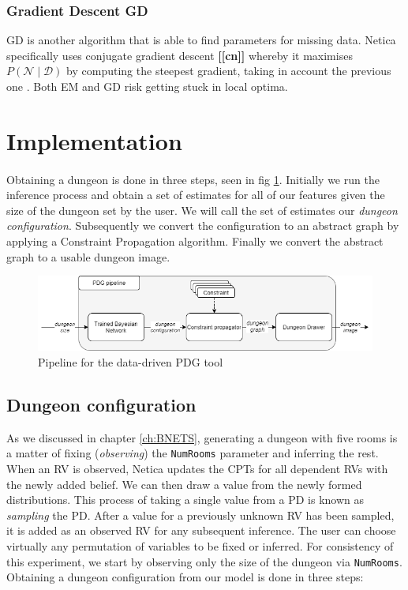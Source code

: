 \documentclass{UoYCSproject}
\begin{document}
\subsubsection{Gradient Descent GD}
GD is another algorithm that is able to find parameters for missing data. Netica specifically uses conjugate gradient descent \textbf{[[cn]]} whereby it maximises \(P(\mathcal{N} \mid \mathcal{D})\) by computing the steepest gradient, taking in account the previous one \parencite[p47]{neticaCman}. Both EM and GD risk getting stuck in local optima.

\section{Implementation}
\label{sec:implementation}
\paragraph{}
Obtaining a dungeon is done in three steps, seen in fig \ref{fig:PDGPipeline}. Initially we run the inference process and obtain a set of estimates for all of our features given the size of the dungeon set by the user. We will call the set of estimates our \textit{dungeon configuration}. Subsequently we convert the configuration to an abstract graph by applying a Constraint Propagation algorithm. Finally we convert the abstract graph to a usable dungeon image.

\begin{figure}[htb]
  \centering
    \includegraphics[width=\textwidth]{figures/BPDG_flow.png}
    \caption{Pipeline for the data-driven PDG tool}
  \label{fig:PDGPipeline}
\end{figure}

\subsection{Dungeon configuration}
As we discussed in chapter \ref{ch:BNETS}, generating a dungeon with five rooms is a matter of fixing (\textit{observing}) the \texttt{NumRooms} parameter and inferring the rest. When an RV is observed, Netica updates the CPTs for all dependent RVs with the newly added belief. We can then draw a value from the newly formed distributions. This process of taking a single value from a PD is known as \textit{sampling} the PD. After a value for a previously unknown RV has been sampled, it is added as an observed RV for any subsequent inference. The user can choose virtually any permutation of variables to be fixed or inferred. For consistency of this experiment, we start by observing only the size of the dungeon via \texttt{NumRooms}. Obtaining a dungeon configuration from our model is done in three steps:
\end{document}
